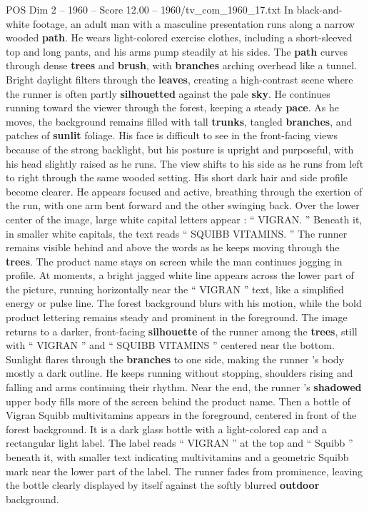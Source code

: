 \begin{textsample}{POS Dim 2 – 1960 – Score 12.00 – 1960/tv\_com\_1960\_17.txt}  \label{ex:f2_pos_020}
In black-and-white footage, an adult man with a masculine presentation runs along a narrow wooded \textbf{path}.
He wears light-colored exercise clothes, including a short-sleeved top and long pants, and his arms pump steadily at his sides.
The \textbf{path} curves through dense \textbf{trees} and \textbf{brush}, with \textbf{branches} arching overhead like a tunnel.
Bright daylight filters through the \textbf{leaves}, creating a high-contrast scene where the runner is often partly \textbf{silhouetted} against the pale \textbf{sky}.
He continues running toward the viewer through the forest, keeping a steady \textbf{pace}.
As he moves, the background remains filled with tall \textbf{trunks}, tangled \textbf{branches}, and patches of \textbf{sunlit} foliage.
His face is difficult to see in the front-facing views because of the strong backlight, but his posture is upright and purposeful, with his head slightly raised as he runs.
The view shifts to his side as he runs from left to right through the same wooded setting.
His short dark hair and side profile become clearer.
He appears focused and active, breathing through the exertion of the run, with one arm bent forward and the other swinging back.
Over the lower center of the image, large white capital letters appear : “ VIGRAN. ” Beneath it, in smaller white capitals, the text reads “ SQUIBB VITAMINS. ” The runner remains visible behind and above the words as he keeps moving through the \textbf{trees}.
The product name stays on screen while the man continues jogging in profile.
At moments, a bright jagged white line appears across the lower part of the picture, running horizontally near the “ VIGRAN ” text, like a simplified energy or pulse line.
The forest background blurs with his motion, while the bold product lettering remains steady and prominent in the foreground.
The image returns to a darker, front-facing \textbf{silhouette} of the runner among the \textbf{trees}, still with “ VIGRAN ” and “ SQUIBB VITAMINS ” centered near the bottom.
Sunlight flares through the \textbf{branches} to one side, making the runner ’s body mostly a dark outline.
He keeps running without stopping, shoulders rising and falling and arms continuing their rhythm.
Near the end, the runner ’s \textbf{shadowed} upper body fills more of the screen behind the product name.
Then a bottle of Vigran Squibb multivitamins appears in the foreground, centered in front of the forest background.
It is a dark glass bottle with a light-colored cap and a rectangular light label.
The label reads “ VIGRAN ” at the top and “ Squibb ” beneath it, with smaller text indicating multivitamins and a geometric Squibb mark near the lower part of the label.
The runner fades from prominence, leaving the bottle clearly displayed by itself against the softly blurred \textbf{outdoor} background.

\end{textsample}
